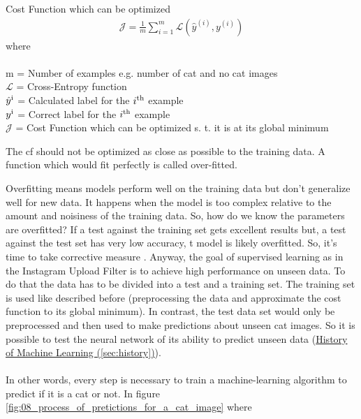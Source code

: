 \begin{definition}[label=def:cost_function]{Cost Function which can be optimized}
	\begin{align*}
	\mathcal{J} = \frac{1}{m} \sum_{i=1}^m \mathcal{L}(\hat{y}^{(i)}, y^{(i)})
	\end{align*}
	where \\\\
	m = Number of examples e.g. number of cat and no cat images \\
	\(\mathcal{L}\) = Cross-Entropy function \\
	\(\hat{y}\textsuperscript{i}\) = Calculated label for the \(i\textsuperscript{th} \) example\\
	\(y\textsuperscript{i}\)     = Correct label for the \(i\textsuperscript{th} \)  example\\
	\(    \mathcal{J} \) = Cost Function which can be optimized s. t. it is at its global minimum
\end{definition}

The \Gls{cf} should not be optimized as close as possible to the training data. A function which would fit perfectly is called over-fitted. 

Overfitting means models perform well on the training data but don’t generalize well for new data. It happens when the model is too complex relative to the amount and noisiness of the training data. So, how do we know the parameters are overfitted? If a test against the training set gets excellent results but, a test against the test set has very low accuracy, t model is likely overfitted. So, it's time to take corrective measure \cite[p. 110]{Goodfellow-et-al-2016}. Anyway, the goal of supervised learning as in the Instagram Upload Filter is to achieve high performance on unseen data. To do that the data has to be divided into a test and a training set. The training set is used like described before (preprocessing the data and approximate the cost function to its global minimum). In contrast, the test data set would only be preprocessed and then used to make predictions about unseen cat images. So it is possible to test the neural network of its ability to predict unseen data (\hyperref[sec:history]{History of Machine Learning (\ref{sec:history})}).\\\\

In other words, every step is necessary to train a machine-learning algorithm to predict if it is a cat or not. In figure \ref{fig:08_process_of_pretictions_for_a_cat_image} where


